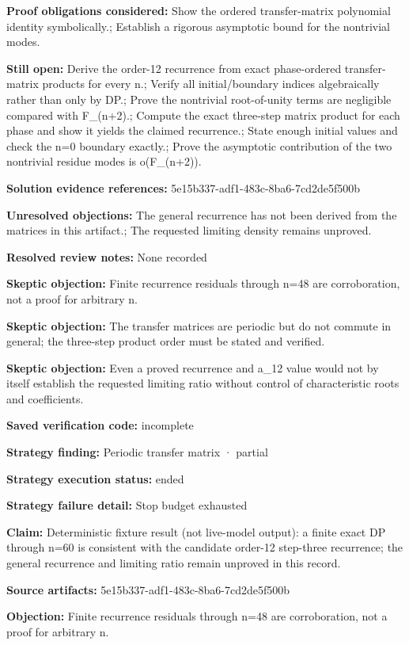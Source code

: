 \documentclass[11pt]{article}
\begin{document}
\textbf{Proof obligations considered:} Show the ordered transfer-matrix polynomial identity symbolically.; Establish a rigorous asymptotic bound for the nontrivial modes.\par
\textbf{Still open:} Derive the order-12 recurrence from exact phase-ordered transfer-matrix products for every n.; Verify all initial/boundary indices algebraically rather than only by DP.; Prove the nontrivial root-of-unity terms are negligible compared with F\_(n+2).; Compute the exact three-step matrix product for each phase and show it yields the claimed recurrence.; State enough initial values and check the n=0 boundary exactly.; Prove the asymptotic contribution of the two nontrivial residue modes is o(F\_(n+2)).\par
\textbf{Solution evidence references:} 5e15b337-adf1-483c-8ba6-7cd2de5f500b\par
\textbf{Unresolved objections:} The general recurrence has not been derived from the matrices in this artifact.; The requested limiting density remains unproved.\par
\textbf{Resolved review notes:} None recorded\par
\textbf{Skeptic objection:} Finite recurrence residuals through n=48 are corroboration, not a proof for arbitrary n.\par
\textbf{Skeptic objection:} The transfer matrices are periodic but do not commute in general; the three-step product order must be stated and verified.\par
\textbf{Skeptic objection:} Even a proved recurrence and a\_12 value would not by itself establish the requested limiting ratio without control of characteristic roots and coefficients.\par
\textbf{Saved verification code:} incomplete\par
\textbf{Strategy finding:} Periodic transfer matrix · partial\par
\textbf{Strategy execution status:} ended\par
\textbf{Strategy failure detail:} Stop budget exhausted\par
\textbf{Claim:} Deterministic fixture result (not live-model output): a finite exact DP through n=60 is consistent with the candidate order-12 step-three recurrence; the general recurrence and limiting ratio remain unproved in this record.\par
\textbf{Source artifacts:} 5e15b337-adf1-483c-8ba6-7cd2de5f500b\par
\textbf{Objection:} Finite recurrence residuals through n=48 are corroboration, not a proof for arbitrary n.\par
\end{document}
